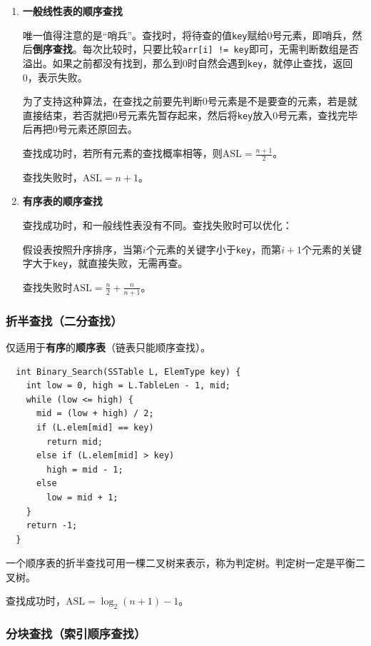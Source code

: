 \documentclass[12pt, a4paper, oneside]{ctexart}
\begin{document}
\begin{enumerate}
  \item {\bf 一般线性表的顺序查找}
  
  唯一值得注意的是“哨兵”。查找时，将待查的值\verb|key|赋给0号元素，即哨兵，然后\textbf{倒序查找}。每次比较时，只要比较\verb|arr[i] != key|即可，无需判断数组是否溢出。如果之前都没有找到，那么到0时自然会遇到\verb|key|，就停止查找，返回0，表示失败。

  为了支持这种算法，在查找之前要先判断0号元素是不是要查的元素，若是就直接结束，若否就把0号元素先暂存起来，然后将\verb|key|放入0号元素，查找完毕后再把0号元素还原回去。

  查找成功时，若所有元素的查找概率相等，则$\text{ASL}=\frac{n+1}{2}$。

  查找失败时，$\text{ASL}=n+1$。

  \item {\bf 有序表的顺序查找}
  
  查找成功时，和一般线性表没有不同。查找失败时可以优化：

  假设表按照升序排序，当第$i$个元素的关键字小于\verb|key|，而第$i+1$个元素的关键字大于\verb|key|，就直接失败，无需再查。

  查找失败时$\text{ASL}=\frac{n}{2}+\frac{n}{n+1}$。
\end{enumerate}

\subsubsection{折半查找（二分查找）}

仅适用于\textbf{有序}的\textbf{顺序表}（链表只能顺序查找）。

\begin{lstlisting}
  int Binary_Search(SSTable L, ElemType key) {
    int low = 0, high = L.TableLen - 1, mid;
    while (low <= high) {
      mid = (low + high) / 2;
      if (L.elem[mid] == key)
        return mid;
      else if (L.elem[mid] > key)
        high = mid - 1;
      else
        low = mid + 1;
    }
    return -1;
  }
\end{lstlisting}

一个顺序表的折半查找可用一棵二叉树来表示，称为判定树。判定树一定是平衡二叉树。

查找成功时，$\text{ASL}=\log_2 (n+1)-1$。

\subsubsection{分块查找（索引顺序查找）}
\end{document}
